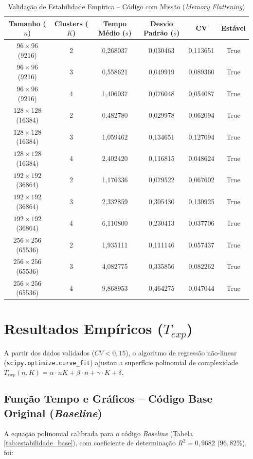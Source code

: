 \documentclass[11pt,a4paper]{article}
\begin{document}
\begin{table}[H]
\centering
\caption{Validação de Estabilidade Empírica -- Código com Missão (\textit{Memory Flattening})}
\label{tab:estabilidade_missao}
\small
\setlength{\tabcolsep}{6pt}
\begin{tabular}{@{}cccccc@{}}
\toprule
\textbf{Tamanho ($n$)} & \textbf{Clusters ($K$)} & \textbf{Tempo Médio ($s$)} & \textbf{Desvio Padrão ($s$)} & \textbf{CV} & \textbf{Estável} \\ \midrule
$96 \times 96$ (9216)    & 2 & 0,268037 & 0,030463 & 0,113651 & True \\
$96 \times 96$ (9216)    & 3 & 0,558621 & 0,049919 & 0,089360 & True \\
$96 \times 96$ (9216)    & 4 & 1,406037 & 0,076048 & 0,054087 & True \\
$128 \times 128$ (16384) & 2 & 0,482780 & 0,029978 & 0,062094 & True \\
$128 \times 128$ (16384) & 3 & 1,059462 & 0,134651 & 0,127094 & True \\
$128 \times 128$ (16384) & 4 & 2,402420 & 0,116815 & 0,048624 & True \\
$192 \times 192$ (36864) & 2 & 1,176336 & 0,079522 & 0,067602 & True \\
$192 \times 192$ (36864) & 3 & 2,332859 & 0,305430 & 0,130925 & True \\
$192 \times 192$ (36864) & 4 & 6,110800 & 0,230413 & 0,037706 & True \\
$256 \times 256$ (65536) & 2 & 1,935111 & 0,111146 & 0,057437 & True \\
$256 \times 256$ (65536) & 3 & 4,082775 & 0,335856 & 0,082262 & True \\
$256 \times 256$ (65536) & 4 & 9,868953 & 0,464275 & 0,047044 & True \\ \bottomrule
\end{tabular}
\end{table}

\section{Resultados Empíricos ($T_{exp}$)}

A partir dos dados validados ($CV < 0,15$), o algoritmo de regressão não-linear (\texttt{scipy.optimize.curve\_fit}) ajustou a superfície polinomial de complexidade $T_{exp}(n, K) = \alpha \cdot nK + \beta \cdot n + \gamma \cdot K + \delta$.

\subsection{Função Tempo e Gráficos -- Código Base Original (\textit{Baseline})}
A equação polinomial calibrada para o código \textit{Baseline} (Tabela \ref{tab:estabilidade_base}), com coeficiente de determinação $R^2 = 0,9682$ ($96,82\%$), foi:
\end{document}
